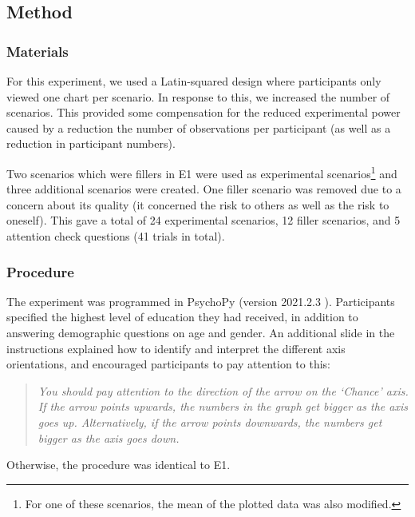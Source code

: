 \documentclass[journal]{vgtc}                %
\begin{document}
\hypertarget{method}{%
\subsection{Method}\label{method}}

\hypertarget{materials-1}{%
\subsubsection{Materials}\label{materials-1}}

For this experiment, we used a Latin-squared design where participants
only viewed one chart per scenario. In response to this, we increased
the number of scenarios. This provided some compensation for the reduced
experimental power caused by a reduction the number of observations per
participant (as well as a reduction in participant numbers).

Two scenarios which were fillers in E1 were used as experimental
scenarios\footnote{For one of these scenarios, the mean of the plotted data was also
  modified.} and three additional scenarios were created. One filler
scenario was removed due to a concern about its quality (it concerned
the risk to others as well as the risk to oneself). This gave a total of
24 experimental scenarios, 12 filler scenarios, and 5 attention check
questions (41 trials in total).

\hypertarget{procedure-1}{%
\subsubsection{Procedure}\label{procedure-1}}

The experiment was programmed in PsychoPy (version 2021.2.3 \citet{peirce_psychopy2_2019}). Participants specified the highest level of education they had received,
in addition to answering demographic questions on age and gender. An
additional slide in the instructions explained how to identify and
interpret the different axis orientations, and encouraged participants
to pay attention to this:

\begin{quote}
\emph{You should pay attention to the direction of the arrow on the
`Chance' axis. If the arrow points upwards, the numbers in the graph
get bigger as the axis goes up. Alternatively, if the arrow points
downwards, the numbers get bigger as the axis goes down.}
\end{quote}

Otherwise, the procedure was identical to E1.
\end{document}
